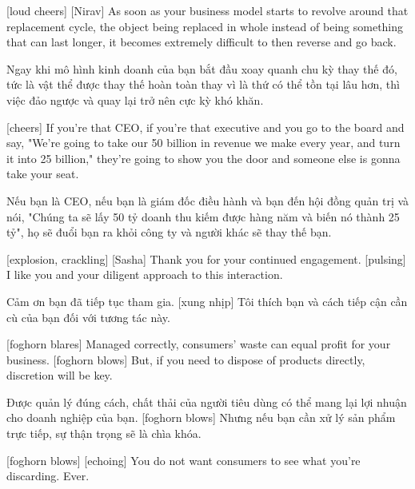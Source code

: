 \documentclass[a4paper]{article}
\begin{document}
	
	[loud cheers]
	[Nirav] As soon as your business model starts to revolve around that replacement cycle, the object being replaced in whole instead of being something that can last longer, it becomes extremely difficult to then reverse and go back.
	
	\begin{vietnamese-v2}
		 Ngay khi mô hình kinh doanh của bạn bắt đầu xoay quanh chu kỳ thay thế đó, tức là vật thể được thay thế hoàn toàn thay vì là thứ có thể tồn tại lâu hơn, thì việc đảo ngược và quay lại trở nên cực kỳ khó khăn.
	\end{vietnamese-v2}
	
	
	[cheers]
	If you're that CEO, if you're that executive and you go to the board and say, "We're going to take our 50 billion in revenue we make every year, and turn it into 25 billion," they're going to show you the door and someone else is gonna take your seat.
	
	
	\begin{vietnamese-v2}
		[hoan hô]
		Nếu bạn là CEO, nếu bạn là giám đốc điều hành và bạn đến hội đồng quản trị và nói, "Chúng ta sẽ lấy 50 tỷ doanh thu kiếm được hàng năm và biến nó thành 25 tỷ", họ sẽ đuổi bạn ra khỏi công ty và người khác sẽ thay thế bạn.
	\end{vietnamese-v2}
	
	[explosion, crackling]
	[Sasha] Thank you for your continued engagement.
	[pulsing]
	I like you and your diligent approach to this interaction.
	
	\begin{vietnamese-v2}
		 Cảm ơn bạn đã tiếp tục tham gia.
		[xung nhịp]
		Tôi thích bạn và cách tiếp cận cần cù của bạn đối với tương tác này.
	\end{vietnamese-v2}
	
	[foghorn blares]
	Managed correctly, consumers' waste can equal profit for your business.
	[foghorn blows]
	But, if you need to dispose of products directly, discretion will be key.
	
	\begin{vietnamese-v2}
		Được quản lý đúng cách, chất thải của người tiêu dùng có thể mang lại lợi nhuận cho doanh nghiệp của bạn.
		[foghorn blows]
		Nhưng nếu bạn cần xử lý sản phẩm trực tiếp, sự thận trọng sẽ là chìa khóa.
	\end{vietnamese-v2}
	
	
	[foghorn blows]
	[echoing] You do not want consumers to see what you're discarding. Ever.
	
\end{document}
